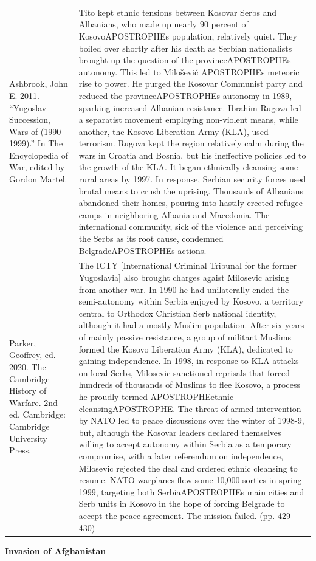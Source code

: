 {\begin{longtable}{p{}p{}}
Ashbrook, John E. 2011. “Yugoslav Succession, Wars of (1990–1999).” In The Encyclopedia of War, edited by Gordon Martel. & Tito kept ethnic tensions between Kosovar Serbs and Albanians, who made up nearly 90 percent of KosovoAPOSTROPHEs population, relatively quiet. They boiled over shortly after his death as Serbian nationalists brought up the question of the provinceAPOSTROPHEs autonomy. This led to Milošević APOSTROPHEs meteoric rise to power. He purged the Kosovar Communist party and reduced the provinceAPOSTROPHEs autonomy in 1989, sparking increased Albanian resistance. Ibrahim Rugova led a separatist movement employing non-violent means, while another, the Kosovo Liberation Army (KLA), used terrorism. Rugova kept the region relatively calm during the wars in Croatia and Bosnia, but his ineffective policies led to the growth of the KLA. It began ethnically cleansing some rural areas by 1997. In response, Serbian security forces used brutal means to crush the uprising. Thousands of Albanians abandoned their homes, pouring into hastily erected refugee camps in neighboring Albania and Macedonia. The international community, sick of the violence and perceiving the Serbs as its root cause, condemned BelgradeAPOSTROPHEs actions.
\\
Parker, Geoffrey, ed. 2020. The Cambridge History of Warfare. 2nd ed. Cambridge: Cambridge University Press. & The ICTY [International Criminal Tribunal for the former Yugoslavia] also brought charges agaist Milosevic arising from another war. In 1990 he had unilaterally ended the semi-autonomy within Serbia enjoyed by Kosovo, a territory central to Orthodox Christian Serb national identity, although it had a mostly Muslim population. After six years of mainly passive resistance, a group of militant Muslims formed the Kosovo Liberation Army (KLA), dedicated to gaining independence. In 1998, in response to KLA attacks on local Serbs, Milosevic sanctioned reprisals that forced hundreds of thousands of Muslims to flee Kosovo, a process he proudly termed APOSTROPHEethnic cleansingAPOSTROPHE. The threat of armed intervention by NATO led to peace discussions over the winter of 1998-9, but, although the Kosovar leaders declared themselves willing to accept autonomy within Serbia as a temporary compromise, with a later referendum on independence, Milosevic rejected the deal and ordered ethnic cleansing to resume. NATO warplanes flew some 10,000 sorties in spring 1999, targeting both SerbiaAPOSTROPHEs main cities and Serb units in Kosovo in the hope of forcing Belgrade to accept the peace agreement. The mission failed. (pp. 429-430)
\\
\end{longtable}}
\clearpage
         \textbf{Invasion of Afghanistan} 

